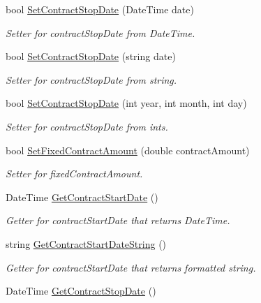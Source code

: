 \begin{DoxyCompactItemize}
bool \hyperlink{class_all_employees_1_1_contract_employee_a60d9959aaf0368d3d951e00dc9b9276b}{Set\+Contract\+Stop\+Date} (Date\+Time date)
\begin{DoxyCompactList}\small\item\em Setter for contract\+Stop\+Date from Date\+Time. \end{DoxyCompactList}\item 
bool \hyperlink{class_all_employees_1_1_contract_employee_a5564f971606a6c44977001b3faef78d1}{Set\+Contract\+Stop\+Date} (string date)
\begin{DoxyCompactList}\small\item\em Setter for contract\+Stop\+Date from string. \end{DoxyCompactList}\item 
bool \hyperlink{class_all_employees_1_1_contract_employee_a3f7473cd491df8b2927333287b57a33d}{Set\+Contract\+Stop\+Date} (int year, int month, int day)
\begin{DoxyCompactList}\small\item\em Setter for contract\+Stop\+Date from ints. \end{DoxyCompactList}\item 
bool \hyperlink{class_all_employees_1_1_contract_employee_aae02116f2c0f03f6cf9ed7c0b047299f}{Set\+Fixed\+Contract\+Amount} (double contract\+Amount)
\begin{DoxyCompactList}\small\item\em Setter for fixed\+Contract\+Amount. \end{DoxyCompactList}\item 
Date\+Time \hyperlink{class_all_employees_1_1_contract_employee_a270e070d2ccf2f707c9441f0ba1f2fad}{Get\+Contract\+Start\+Date} ()
\begin{DoxyCompactList}\small\item\em Getter for contract\+Start\+Date that returns Date\+Time. \end{DoxyCompactList}\item 
string \hyperlink{class_all_employees_1_1_contract_employee_a706f9a356995be719add2e1d522d1625}{Get\+Contract\+Start\+Date\+String} ()
\begin{DoxyCompactList}\small\item\em Getter for contract\+Start\+Date that returns formatted string. \end{DoxyCompactList}\item 
Date\+Time \hyperlink{class_all_employees_1_1_contract_employee_a98cacd6f03b693ba838b36c861c59b10}{Get\+Contract\+Stop\+Date} ()

\end{DoxyCompactItemize}
